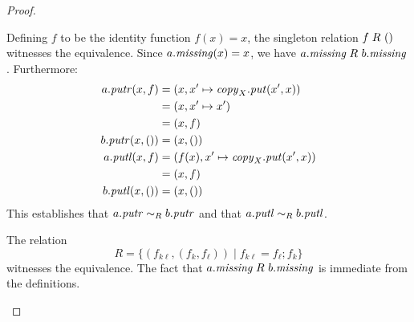\begin{defn}[$R$-similarity]
\begin{theorem}
\begin{lemma}
\begin{theorem}[No products]
\begin{lemma}
\begin{defn}
\begin{theorem}
\begin{theorem}
\begin{corollary}[Hylomorphism]
\begin{defn}
\begin{defn}
\begin{defn}[Symmetrization]
\begin{proof}
\begin{longenum}
\item Defining $f$ to be the identity function $f(x)=x$, the singleton
relation $f \mathrel{R_{}} {()}$ witnesses the equivalence. Since $a.\mathit{missing}(x) =
x$, we have $a.\mathit{missing} \mathrel{R_{}} b.\mathit{missing}$. Furthermore:
\begin{align*}
    a.\mathit{putr}(x,f) &= (x,x' \mapsto \mathit{copy}_X.\mathit{put}(x',x)) \\
    &= (x, x' \mapsto x') \\
    &= (x, f) \\
    b.\mathit{putr}(x,{()}) &= (x,{()}) \\
    a.\mathit{putl}(x,f) &= (f(x),x' \mapsto \mathit{copy}_X.\mathit{put}(x',x)) \\
    &= (x,f) \\
    b.\mathit{putl}(x,{()}) &= (x,{()})
\end{align*}
This establishes that $a.\mathit{putr} \sim_R b.\mathit{putr}$ and that $a.\mathit{putl} \sim_R
b.\mathit{putl}$.

\item The relation
\[R = \{(f_{k\ell},(f_k,f_\ell)) \mid f_{k\ell} = f_\ell;f_k\}\]
witnesses the equivalence. The fact that $a.\mathit{missing} \mathrel{R_{}} b.\mathit{missing}$ is
immediate from the definitions.


\end{longenum}
\end{proof}
\end{defn}
\end{defn}
\end{defn}
\end{corollary}
\end{theorem}
\end{theorem}
\end{defn}
\end{lemma}
\end{theorem}
\end{lemma}
\end{theorem}
\end{defn}
